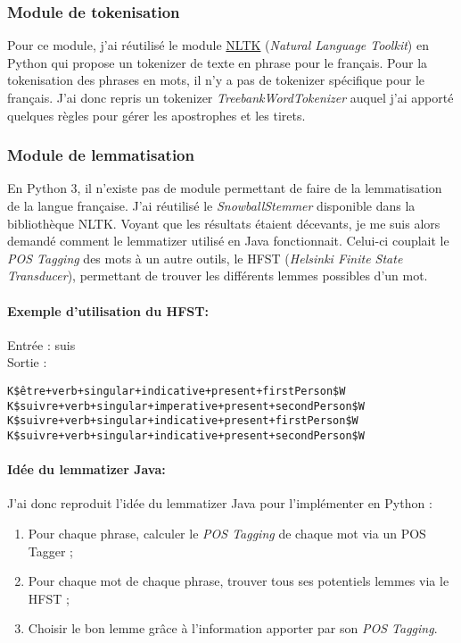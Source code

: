         \subsubsection{Module de tokenisation}
            Pour ce module, j'ai réutilisé le module \href{http://www.nltk.org/}{NLTK} (\textit{Natural Language Toolkit}) en Python qui propose un tokenizer de texte en phrase pour le français. Pour la tokenisation des phrases en mots, il n'y a pas de tokenizer spécifique pour le français. J'ai donc repris un tokenizer \textit{TreebankWordTokenizer} auquel j'ai apporté quelques règles pour gérer les apostrophes et les tirets.

        \subsubsection{Module de lemmatisation}
            En Python 3, il n'existe pas de module permettant de faire de la lemmatisation de la langue française. J'ai réutilisé le \textit{SnowballStemmer} disponible dans la bibliothèque NLTK. Voyant que les résultats étaient décevants, je me suis alors demandé comment le lemmatizer utilisé en Java fonctionnait. Celui-ci couplait le \textit{POS Tagging} des mots à un autre outils, le HFST (\textit{Helsinki Finite State Transducer}), permettant de trouver les différents lemmes possibles d'un mot.\\

            \paragraph{Exemple d'utilisation du HFST:}
                Entrée : \og suis \fg\\
                Sortie :
\begin{lstlisting}
K$être+verb+singular+indicative+present+firstPerson$W
K$suivre+verb+singular+imperative+present+secondPerson$W
K$suivre+verb+singular+indicative+present+firstPerson$W
K$suivre+verb+singular+indicative+present+secondPerson$W
\end{lstlisting}

            \paragraph{Idée du lemmatizer Java:}
                J'ai donc reproduit l'idée du lemmatizer Java pour l'implémenter en Python :
                \begin{enumerate}
                    \item Pour chaque phrase, calculer le \textit{POS Tagging} de chaque mot via un POS Tagger ;
                    \item Pour chaque mot de chaque phrase, trouver tous ses potentiels lemmes via le HFST ;
                    \item Choisir le bon lemme grâce à l'information apporter par son \textit{POS Tagging}.
                \end{enumerate}

